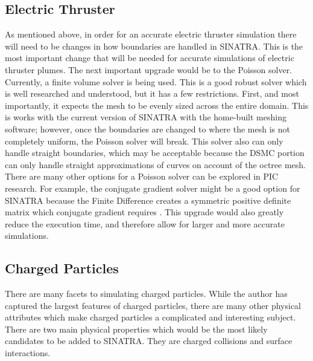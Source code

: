 \subsection{Electric Thruster}

As mentioned above, in order for an accurate electric thruster simulation there will need to be changes in how boundaries are handled in SINATRA. This is the most important change that will be needed for accurate simulations of electric thruster plumes. The next important upgrade would be to the Poisson solver. Currently, a finite volume solver is being used. This is a good robust solver which is well researched and understood, but it has a few restrictions. First, and most importantly, it expects the mesh to be evenly sized across the entire domain. This is works with the current version of SINATRA with the home-built meshing software; however, once the boundaries are changed to where the mesh is not completely uniform, the Poisson solver will break. This solver also can only handle straight boundaries, which may be acceptable because the DSMC portion can only handle straight approximations of curves on account of the octree mesh. There are many other options for a Poisson solver can be explored in PIC research. For example, the conjugate gradient solver might be a good option for SINATRA because the Finite Difference creates a symmetric positive definite matrix which conjugate gradient requires \cite{FD_GS}. This upgrade would also greatly reduce the execution time, and therefore allow for larger and more accurate simulations. \par

\subsection{Charged Particles}

There are many facets to simulating charged particles. While the author has captured the largest features of charged particles, there are many other physical attributes which make charged particles a complicated and interesting subject. There are two main physical properties which would be the most likely candidates to be added to SINATRA. They are charged collisions and surface interactions. \par

